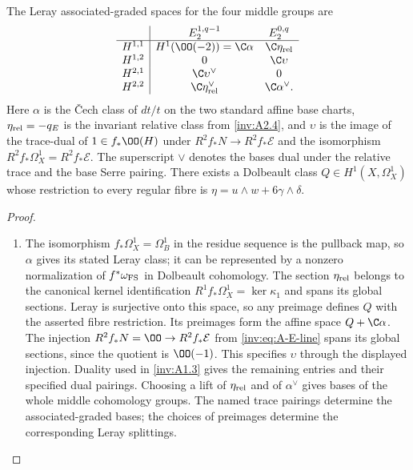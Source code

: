 \begin{proposition}\hypertarget{tag-01RZ}{}\label{inv:A3.2}\label{wb:lem:bcpr-eta-extension}

The Leray associated-graded spaces for the four middle groups are
\[
\begin{array}{c|cc}
&E_2^{1,q-1}&E_2^{0,q}\\\hline
H^{1,1}&H^1(\OO(-2))=\C\alpha&\C\eta_{\rm rel}\\
H^{1,2}&0&\C\upsilon\\
H^{2,1}&\C\upsilon^\vee&0\\
H^{2,2}&\C\eta_{\rm rel}^\vee&\C\alpha^\vee.
\end{array}
\]
Here $\alpha$ is the \v Cech class of $dt/t$ on the two standard affine
base charts, $\eta_{\rm rel}=-q_E$ is the invariant relative class
from \ref{inv:A2.4}, and $\upsilon$ is the image of the trace-dual of
$1\in f_*\OO(H)$ under $R^2f_*N\to R^2f_*\mathcal E$ and the
isomorphism $R^2f_*\Omega_X^1=R^2f_*\mathcal E$.
The superscript $\vee$ denotes the bases dual under the relative
trace and the base Serre pairing.  There exists a Dolbeault class
$Q\in H^1(X,\Omega_X^1)$ whose restriction to every regular fibre
is $\eta=u\wedge w+6\gamma\wedge\delta$.
\end{proposition}


\begin{proof}
\begin{enumerate}[label=\arabic*.,leftmargin=*]
\item The isomorphism $f_*\Omega_X^1=\Omega_B^1$ in the residue sequence
is the pullback map, so $\alpha$ gives its stated Leray
class; it can be represented by a nonzero normalization of
$f^*\omega_{\rm FS}$ in Dolbeault cohomology.  The section
$\eta_{\rm rel}$ belongs to the canonical kernel identification
$R^1f_*\Omega_X^1=\ker\kappa_1$ and spans its global sections.
Leray is surjective onto this space, so any preimage defines $Q$
with the asserted fibre restriction.  Its preimages form the affine space $Q+\C\alpha$.
The injection $R^2f_*N=\OO\to R^2f_*\mathcal E$ from
\eqref{inv:eq:A-E-line} spans its global sections, since the quotient
is $\OO(-1)$.  This specifies $\upsilon$ through the displayed injection.  Duality used in \ref{inv:A1.3} gives the remaining entries
and their specified dual pairings.  Choosing a lift of
$\eta_{\rm rel}$ and of $\alpha^\vee$ gives bases of the whole
middle cohomology groups.  The named trace pairings determine the associated-graded bases;
the choices of preimages determine the corresponding Leray splittings.
\end{enumerate}
\end{proof}